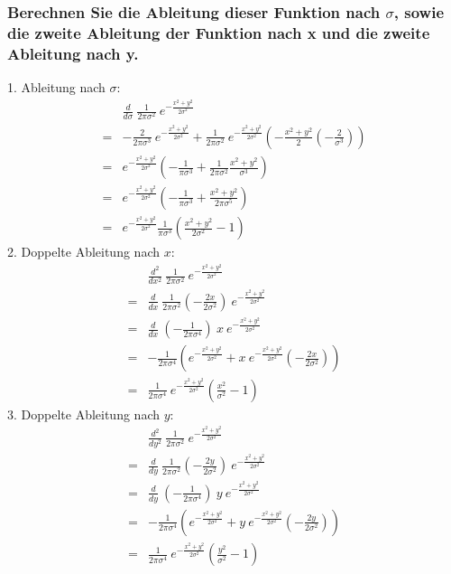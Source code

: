\subsubsection*{Berechnen Sie die Ableitung dieser Funktion nach $\sigma$, sowie die zweite Ableitung der Funktion nach x und die zweite Ableitung nach y.}
1. Ableitung nach $\sigma$:
\begin{align*}
& \frac{d}{d \sigma}~\frac{1}{2 \pi \sigma^2}~e^{-\frac{x^2 + y^2}{2 \sigma^2}}\\
=& -\frac{2}{2 \pi \sigma^3}~e^{-\frac{x^2 + y^2}{2 \sigma^2}} + \frac{1}{2 \pi \sigma^2}~e^{-\frac{x^2 + y^2}{2 \sigma^2}}(-\frac{x^2 + y^2}{2}(-\frac{2}{\sigma^3}))\\
=& e^{-\frac{x^2 + y^2}{2 \sigma^2}}(-\frac{1}{\pi \sigma^3} + \frac{1}{2 \pi \sigma^2} \frac{x^2 + y^2}{\sigma^3})\\
=& e^{-\frac{x^2 + y^2}{2 \sigma^2}} (-\frac{1}{\pi \sigma^3} + \frac{x^2 + y^2}{2 \pi \sigma^5})\\
=& e^{-\frac{x^2 + y^2}{2 \sigma^2}} \frac{1}{\pi \sigma^3} (\frac{x^2 + y^2}{2 \sigma^2} - 1)
\end{align*}
2. Doppelte Ableitung nach $x$:
\begin{align*}
& \frac{d^2}{d x^2}~\frac{1}{2 \pi \sigma^2}~e^{-\frac{x^2 + y^2}{2 \sigma^2}}\\
=& \frac{d}{d x}~\frac{1}{2 \pi \sigma^2} (-\frac{2x}{2 \sigma^2})~e^{-\frac{x^2 + y^2}{2 \sigma^2}}\\
=& \frac{d}{d x}~(-\frac{1}{2 \pi \sigma^4})~x~e^{-\frac{x^2 + y^2}{2 \sigma^2}}\\
=& -\frac{1}{2 \pi \sigma^4}(e^{-\frac{x^2 + y^2}{2 \sigma^2}} + x~e^{-\frac{x^2 + y^2}{2 \sigma^2}} (-\frac{2x}{2 \sigma^2}))\\
=& \frac{1}{2 \pi \sigma^4}~e^{-\frac{x^2 + y^2}{2 \sigma^2}} (\frac{x^2}{\sigma^2} - 1)
\end{align*}
3. Doppelte Ableitung nach $y$:
\begin{align*}
& \frac{d^2}{d y^2}~\frac{1}{2 \pi \sigma^2}~e^{-\frac{x^2 + y^2}{2 \sigma^2}}\\
=& \frac{d}{d y}~\frac{1}{2 \pi \sigma^2} (-\frac{2y}{2 \sigma^2})~e^{-\frac{x^2 + y^2}{2 \sigma^2}}\\
=& \frac{d}{d y}~(-\frac{1}{2 \pi \sigma^4})~y~e^{-\frac{x^2 + y^2}{2 \sigma^2}}\\
=& -\frac{1}{2 \pi \sigma^4}(e^{-\frac{x^2 + y^2}{2 \sigma^2}} + y~e^{-\frac{x^2 + y^2}{2 \sigma^2}} (-\frac{2y}{2 \sigma^2}))\\
=& \frac{1}{2 \pi \sigma^4}~e^{-\frac{x^2 + y^2}{2 \sigma^2}} (\frac{y^2}{\sigma^2} - 1)
\end{align*}

